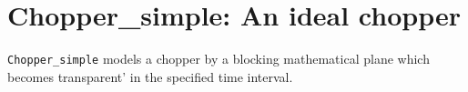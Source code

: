\section{Chopper_simple: An ideal chopper}

\texttt{Chopper\_simple} models a chopper by a blocking mathematical plane which becomes transparent'
in the specified time interval. 

